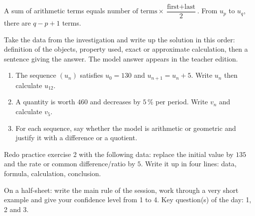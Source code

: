 \begin{traceecrite}A sum of arithmetic terms equals $\text{number of terms}\times\dfrac{\text{first}+\text{last}}2$. From $u_p$ to $u_q$, there are $q-p+1$ terms.\end{traceecrite}

\begin{exemple}
Take the data from the investigation and write up the solution in this order: definition of the objects, property used, exact or approximate calculation, then a sentence giving the answer. The model answer appears in the teacher edition.
\end{exemple}

\begin{exercice}[-- essential]
\begin{enumerate}\item The sequence $(u_n)$ satisfies $u_0=130$ and $u_{n+1}=u_n+5$. Write $u_n$ then calculate $u_{12}$.\item A quantity is worth $460$ and decreases by $5\,\%$ per period. Write $v_n$ and calculate $v_5$.\item For each sequence, say whether the model is arithmetic or geometric and justify it with a difference or a quotient.\end{enumerate}
\end{exercice}


\begin{dm}Redo practice exercise 2 with the following data: replace the initial value by $135$ and the rate or common difference/ratio by $5$. Write it up in four lines: data, formula, calculation, conclusion.\end{dm}

\begin{sortie}On a half-sheet: write the main rule of the session, work through a very short example and give your confidence level from 1 to 4. Key question(s) of the day: 1, 2 and 3.\end{sortie}

